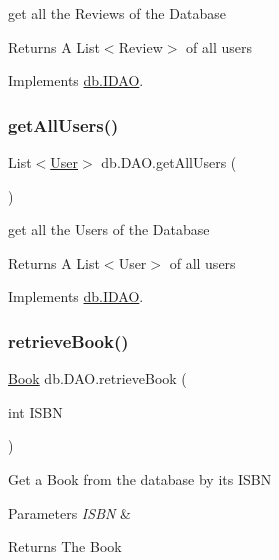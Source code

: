 get all the Reviews of the Database \begin{DoxyReturn}{Returns}
A List$<$\+Review$>$ of all users 
\end{DoxyReturn}


Implements \hyperlink{interfacedb_1_1_i_d_a_o_a3d9625d7e5426aad3c2e70fd0174e5f0}{db.\+I\+D\+AO}.

\mbox{\label{classdb_1_1_d_a_o_a3b627b7177990799fd02e0c38b8adb70}} 
\subsubsection{\texorpdfstring{get\+All\+Users()}{getAllUsers()}}
{\footnotesize\ttfamily List$<$\hyperlink{classserver_1_1data_1_1_user}{User}$>$ db.\+D\+A\+O.\+get\+All\+Users (\begin{DoxyParamCaption}{ }\end{DoxyParamCaption})}

get all the Users of the Database \begin{DoxyReturn}{Returns}
A List$<$\+User$>$ of all users 
\end{DoxyReturn}


Implements \hyperlink{interfacedb_1_1_i_d_a_o_a88b60729d9517ca9aa31b7db7ae07aee}{db.\+I\+D\+AO}.

\mbox{\label{classdb_1_1_d_a_o_ade778f907d0a74dc27c4fc03f8709815}} 
\subsubsection{\texorpdfstring{retrieve\+Book()}{retrieveBook()}}
{\footnotesize\ttfamily \hyperlink{classserver_1_1data_1_1_book}{Book} db.\+D\+A\+O.\+retrieve\+Book (\begin{DoxyParamCaption}\item[{int}]{I\+S\+BN }\end{DoxyParamCaption})}

Get a Book from the database by its I\+S\+BN 
\begin{DoxyParams}{Parameters}
{\em I\+S\+BN} & \\
\hline
\end{DoxyParams}
\begin{DoxyReturn}{Returns}
The Book 
\end{DoxyReturn}


